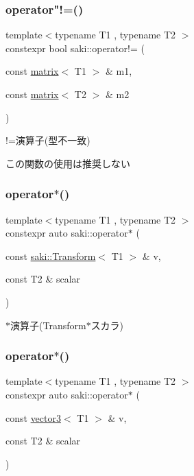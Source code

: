 \subsubsection{\texorpdfstring{operator"!=()}{operator!=()}\hspace{0.1cm}{\footnotesize\ttfamily [11/11]}}
{\footnotesize\ttfamily template$<$typename T1 , typename T2 $>$ \\
constexpr bool saki\+::operator!= (\begin{DoxyParamCaption}\item[{const \mbox{\hyperlink{classsaki_1_1matrix}{matrix}}$<$ T1 $>$ \&}]{m1,  }\item[{const \mbox{\hyperlink{classsaki_1_1matrix}{matrix}}$<$ T2 $>$ \&}]{m2 }\end{DoxyParamCaption})}



!=演算子(型不一致) 

この関数の使用は推奨しない \mbox{\label{namespacesaki_a4ccd8e3dbc886bb65d452308a8de0409}} 
\subsubsection{\texorpdfstring{operator$\ast$()}{operator*()}\hspace{0.1cm}{\footnotesize\ttfamily [1/14]}}
{\footnotesize\ttfamily template$<$typename T1 , typename T2 $>$ \\
constexpr auto saki\+::operator$\ast$ (\begin{DoxyParamCaption}\item[{const \mbox{\hyperlink{classsaki_1_1_transform}{saki\+::\+Transform}}$<$ T1 $>$ \&}]{v,  }\item[{const T2 \&}]{scalar }\end{DoxyParamCaption})}



$\ast$演算子(Transform$\ast$スカラ) 

\mbox{\label{namespacesaki_abd9716c5a5ccdc1cafb975df8897acb3}} 
\subsubsection{\texorpdfstring{operator$\ast$()}{operator*()}\hspace{0.1cm}{\footnotesize\ttfamily [2/14]}}
{\footnotesize\ttfamily template$<$typename T1 , typename T2 $>$ \\
constexpr auto saki\+::operator$\ast$ (\begin{DoxyParamCaption}\item[{const \mbox{\hyperlink{classsaki_1_1vector3}{vector3}}$<$ T1 $>$ \&}]{v,  }\item[{const T2 \&}]{scalar }\end{DoxyParamCaption})}



